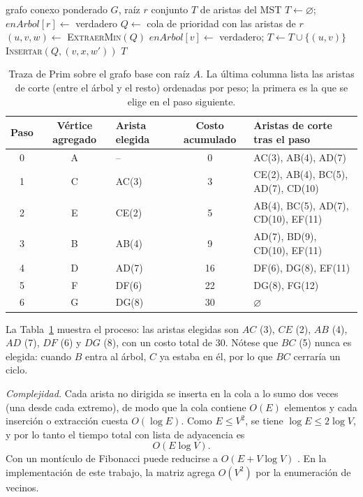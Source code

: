 \documentclass[conference]{IEEEtran}
\begin{document}
\begin{algorithm}[t]
\caption{Prim$(G,r)$}
\label{alg:prim}
\begin{algorithmic}[1]
\Require grafo conexo ponderado $G$, raíz $r$
\Ensure conjunto $T$ de aristas del MST
\State $T\gets\varnothing$; $enArbol[r]\gets$ verdadero
\State $Q\gets$ cola de prioridad con las aristas de $r$
  \State $(u,v,w)\gets$ \textsc{ExtraerMin}$(Q)$
    \State $enArbol[v]\gets$ verdadero; $T\gets T\cup\{(u,v)\}$
      \State \textsc{Insertar}$(Q,(v,x,w'))$
    \EndFor
  \EndIf
\EndWhile
\State \Return $T$
\end{algorithmic}
\end{algorithm}

\begin{table}[t]
\caption{Traza de Prim sobre el grafo base con raíz $A$. La última columna lista las aristas de corte (entre el árbol y el resto) ordenadas por peso; la primera es la que se elige en el paso siguiente.}
\label{tab:prim}
\centering
\footnotesize
\begin{tabular}{@{}cclcl@{}}
\toprule
Paso & Vértice agregado & Arista elegida & Costo acumulado & Aristas de corte tras el paso \\
\midrule
0 & A & -- & 0 & AC(3), AB(4), AD(7) \\
1 & C & AC(3) & 3 & CE(2), AB(4), BC(5), AD(7), CD(10) \\
2 & E & CE(2) & 5 & AB(4), BC(5), AD(7), CD(10), EF(11) \\
3 & B & AB(4) & 9 & AD(7), BD(9), CD(10), EF(11) \\
4 & D & AD(7) & 16 & DF(6), DG(8), EF(11) \\
5 & F & DF(6) & 22 & DG(8), FG(12) \\
6 & G & DG(8) & 30 & $\varnothing$ \\
\bottomrule
\end{tabular}
\end{table}

La Tabla~\ref{tab:prim} muestra el proceso: las aristas elegidas son $AC$ (3), $CE$ (2), $AB$ (4), $AD$ (7), $DF$ (6) y $DG$ (8), con un costo total de 30. Nótese que $BC$ (5) nunca es elegida: cuando $B$ entra al árbol, $C$ ya estaba en él, por lo que $BC$ cerraría un ciclo.

\emph{Complejidad.} Cada arista no dirigida se inserta en la cola a lo sumo dos veces (una desde cada extremo), de modo que la cola contiene $O(E)$ elementos y cada inserción o extracción cuesta $O(\log E)$. Como $E\le V^2$, se tiene $\log E\le 2\log V$, y por lo tanto el tiempo total con lista de adyacencia es
\begin{equation}
O(E\log V).
\end{equation}
Con un montículo de Fibonacci puede reducirse a $O(E+V\log V)$ \cite{clrs}. En la implementación de este trabajo, la matriz agrega $O(V^2)$ por la enumeración de vecinos.
\end{document}
